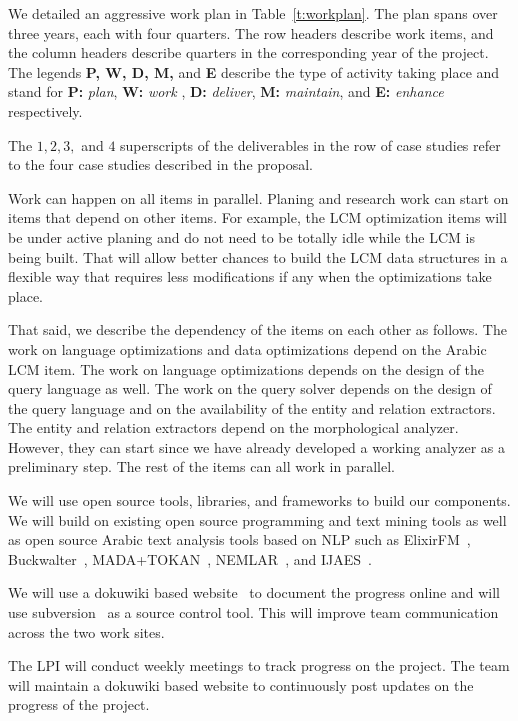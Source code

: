 \documentclass[12pt]{article}
\begin{document}
We detailed an aggressive work plan in Table~\ref{t:workplan}. 
The plan spans over three years, each with four quarters. 
The row headers describe work items, and the column headers
describe quarters in the corresponding year of the project.
The legends {\bf P, W, D, M, } 
and {\bf E} 
describe the type of activity taking place 
and stand for 
{\bf P:} {\em plan}, 
{\bf W:} {\em work }, 
{\bf D:} {\em deliver}, 
{\bf M:}  {\em maintain}, 
and 
{\bf E: } {\em enhance} respectively. 

The $1,2,3,$ and $4$
superscripts of the deliverables in the 
row of case studies refer to the four 
case studies described in the proposal. 

Work can happen on all items in parallel. 
Planing and research work can start on items that depend
on other items. 
For example, the LCM optimization items will be under 
active planing and do not need to be totally idle 
while the LCM is being built. 
That will allow better chances to build the LCM data structures
in a flexible way that requires less modifications if any
when the optimizations take place. 

That said, we describe the dependency of the items on 
each other as follows. 
The work on language optimizations and data optimizations 
depend on the Arabic LCM item. 
The work on language optimizations depends on the design
of the query language as well. 
The work on the query solver depends on the design of the 
query language and on the availability of the entity and relation
extractors. 
The entity and relation extractors depend on the morphological 
analyzer. 
However, they can start since we have already
developed a working analyzer as a preliminary step. 
The rest of the items can all work in parallel. 

We will use open source tools, libraries, and frameworks to 
build our components.
We will build on existing open source programming and text 
mining tools as well as open source Arabic text analysis tools 
based on NLP such as ElixirFM~\cite{Otakar:07}, Buckwalter~\cite{Tim04},
MADA+TOKAN~\cite{Rot08}, 
NEMLAR~\cite{RAl09}, and IJAES~\cite{Int09}.

We will use a dokuwiki based website~\cite{Dok09} 
to document the progress online and will use 
subversion~\cite{Sub09} as a source control tool.
This will improve team communication across the two work sites. 
 
The LPI will conduct weekly meetings to track progress 
on the project.
The team will maintain a dokuwiki based website to continuously 
post updates on the progress of the project.
\end{document}
